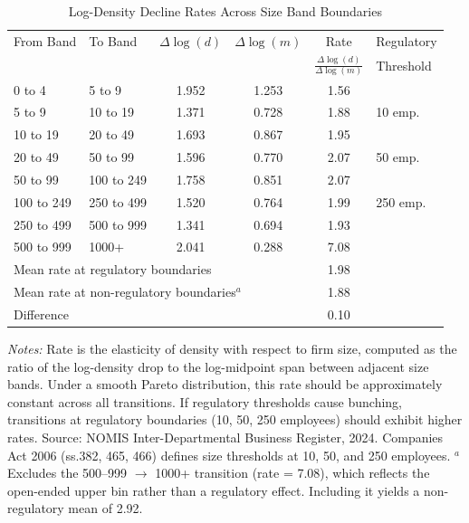 \begin{table}[htbp]
\centering
\caption{Log-Density Decline Rates Across Size Band Boundaries}
\label{tab:density}
\begin{threeparttable}
\begin{tabular}{llcccl}
\toprule
From Band & To Band & $\Delta\log(d)$ & $\Delta\log(m)$ & Rate & Regulatory \\
 & & & & $\frac{\Delta\log(d)}{\Delta\log(m)}$ & Threshold \\
\midrule
0 to 4 & 5 to 9 & 1.952 & 1.253 & 1.56 &  \\
5 to 9 & 10 to 19 & 1.371 & 0.728 & 1.88 & 10 emp. \\
10 to 19 & 20 to 49 & 1.693 & 0.867 & 1.95 &  \\
20 to 49 & 50 to 99 & 1.596 & 0.770 & 2.07 & 50 emp. \\
50 to 99 & 100 to 249 & 1.758 & 0.851 & 2.07 &  \\
100 to 249 & 250 to 499 & 1.520 & 0.764 & 1.99 & 250 emp. \\
250 to 499 & 500 to 999 & 1.341 & 0.694 & 1.93 &  \\
500 to 999 & 1000+ & 2.041 & 0.288 & 7.08 &  \\
\midrule
\multicolumn{4}{l}{Mean rate at regulatory boundaries} & 1.98 & \\
\multicolumn{4}{l}{Mean rate at non-regulatory boundaries$^{a}$} & 1.88 & \\
\multicolumn{4}{l}{Difference} & 0.10 & \\
\bottomrule
\end{tabular}
\begin{tablenotes}[flushleft]
\small
\item \textit{Notes:} Rate is the elasticity of density with respect to firm size, computed as
the ratio of the log-density drop to the log-midpoint span between adjacent size bands. Under
a smooth Pareto distribution, this rate should be approximately constant across all transitions.
If regulatory thresholds cause bunching, transitions at regulatory boundaries (10, 50, 250 employees)
should exhibit higher rates. Source: NOMIS Inter-Departmental Business Register, 2024.
Companies Act 2006 (ss.382, 465, 466) defines size thresholds at 10, 50, and 250 employees.
$^{a}$Excludes the 500--999 $\to$ 1000+ transition (rate = 7.08), which reflects the open-ended
upper bin rather than a regulatory effect. Including it yields a non-regulatory mean of 2.92.
\end{tablenotes}
\end{threeparttable}
\end{table}

